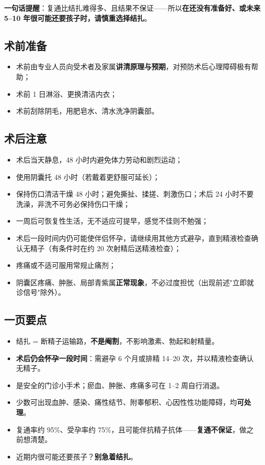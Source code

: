 \documentclass[12pt,UTF8,openany]{ctexbook}
\begin{document}
\textbf{一句话提醒}：复通比结扎难得多、且结果不保证——所以\textbf{在还没有准备好、或未来 5–10 年很可能还要孩子时，请慎重选择结扎}。

\subsection*{术前准备}

\begin{itemize}
  \item 术前由专业人员向受术者及家属\textbf{讲清原理与预期}，对预防术后心理障碍极有帮助；
  \item 术前 1 日淋浴、更换清洁内衣；
  \item 术前刮除阴毛，用肥皂水、清水洗净阴囊部。
\end{itemize}

\subsection*{术后注意}

\begin{itemize}
  \item 术后当天静息，48 小时内避免体力劳动和剧烈运动；
  \item 使用阴囊托 48 小时（若戴着更舒服可延长）；
  \item 保持伤口清洁干燥 48 小时；避免撕扯、揉搓、刺激伤口；术后 24 小时不要洗澡，非洗不可务必保持伤口干燥；
  \item 一周后可恢复性生活，无不适应可提早，感觉不佳则不勉强；
  \item 术后一段时间内仍可能使伴侣怀孕，请继续用其他方式避孕，直到精液检查确认无精子（有条件时在约 20 次射精后送精液检查）；
  \item 疼痛或不适可服用常规止痛剂；
  \item 阴囊区疼痛、肿胀、局部青紫属\textbf{正常现象}，不必过度担忧（出现前述"立即就诊信号"除外）。
\end{itemize}

\subsection*{一页要点}

\begin{itemize}
  \item 结扎 = 断精子运输路，\textbf{不是阉割}，不影响激素、勃起和射精量。
  \item \textbf{术后仍会怀孕一段时间}：需避孕 6 个月或排精 14–20 次，并以精液检查确认无精子。
  \item 是安全的门诊小手术；瘀血、肿胀、疼痛多可在 1–2 周自行消退。
  \item 少数可出现血肿、感染、痛性结节、附睾郁积、心因性性功能障碍，均\textbf{可处理}。
  \item 复通率约 95\%、受孕率约 75\%，且可能伴抗精子抗体——\textbf{复通不保证}，做之前想清楚。
  \item 近期内很可能还要孩子？\textbf{别急着结扎}。
\end{itemize}
\end{document}
